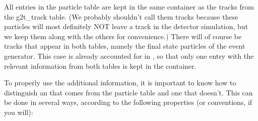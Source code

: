 All entries in the particle table are kept in the same container
as the tracks from the g2t\_track table.  (We probably shouldn't call
them tracks because these particles will most definitely NOT leave a
track in the detector simulation, but we keep them along with the others
for convenience.)  There will of course be tracks that appear in both
tables, namely the final state particles of the event generator.  This
case is already accounted for in \StMcEvent, so that only one entry
with the relevant information from both tables is kept in the container.

To properly use the additional information, it is important to know how to
distinguish an  that comes from the particle table
and one that doesn't.  This can be done in several ways, according to
the following properties (or conventions, if you will):


